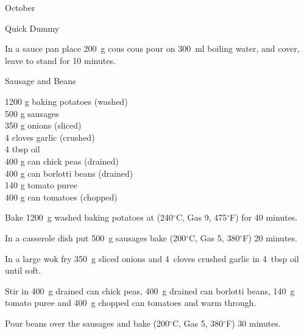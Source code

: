 \begin{menu}{October}
\begin{recipe}{1}{Quick Dummy}
\begin{ingredients}
		\end{ingredients}
	
	
    \begin{instructions}
    \item 
    In a
    sauce pan 
    place
    200~g  cous cous
    pour on
    300~ml  boiling water,
    and cover, leave to stand for 10 minutes.
  
    \end{instructions}
    \end{recipe}%
  
    \begin{recipe}{2}{Sausage and Beans}%
		\begin{ingredients}
		1200 g baking potatoes (washed) \\
	500 g sausages  \\
	350 g onions (sliced) \\
	4 cloves garlic (crushed) \\
	4 tbsp oil  \\
	400 g can chick peas (drained) \\
	400 g can borlotti beans (drained) \\
	140 g tomato puree  \\
	400 g can tomatoes (chopped) \\
	
		\end{ingredients}
	
	
    \begin{instructions}
    \item 
    Bake
    1200~g washed baking potatoes
    at
    (240$^{\circ}$C, Gas 9, 475$^{\circ}$F) for 40 minutes.
  \item 
        In a casserole dish put
        500~g  sausages
        bake (200$^{\circ}$C, Gas 5, 380$^{\circ}$F) 20 minutes.
      \item 
        In a large wok fry
        350~g sliced onions
        and
        4~cloves crushed garlic
        in
        4~tbsp  oil
        until soft.
      \item 
        Stir in
        400~g drained can chick peas,
        400~g drained can borlotti beans,
        140~g  tomato puree
        and
        400~g chopped can tomatoes
        and warm through.
      \item 
        Pour beans over the sausages and bake (200$^{\circ}$C, Gas 5, 380$^{\circ}$F) 30 minutes.
      

\end{instructions}
\end{recipe}
\end{menu}
